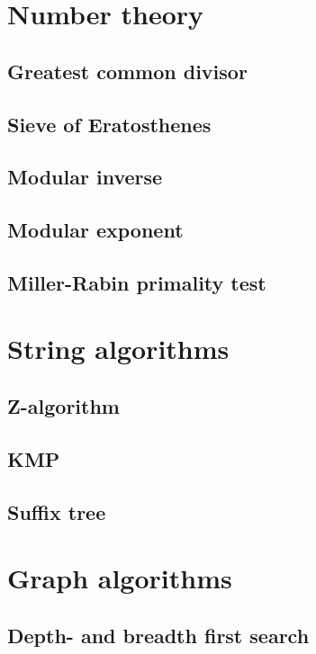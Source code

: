 \documentclass[a4paper,10pt]{article}
\begin{document}
\pagestyle{fancy}
\chead{}
\rhead{\thepage}
\lfoot{}
\cfoot{}
\rfoot{}


\tableofcontents
\newpage
\section{Number theory}
\subsection{Greatest common divisor}

\subsection{Sieve of Eratosthenes}

\subsection{Modular inverse}

\subsection{Modular exponent}

\subsection{Miller-Rabin primality test}
\section{String algorithms}
\subsection{Z-algorithm}
\subsection{KMP}

\subsection{Suffix tree}
\section{Graph algorithms}
\subsection{Depth- and breadth first search}

\end{document}
